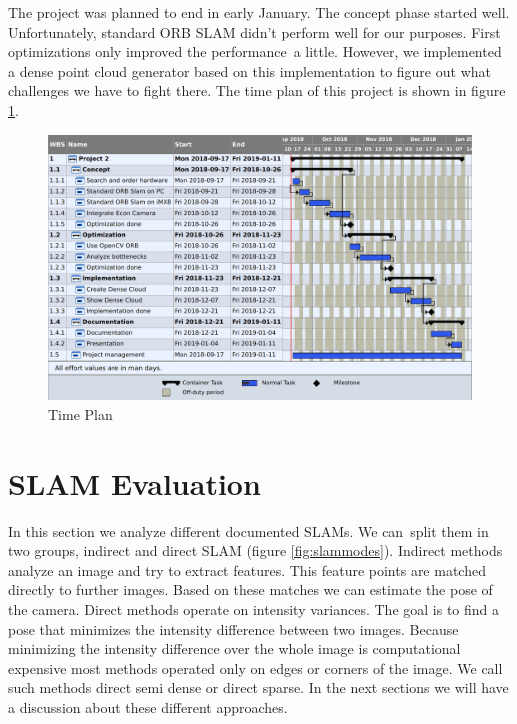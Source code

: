 \documentclass[11pt,a4paper,titlepage,oneside]{report}
\begin{document}
The project was planned to end in early January. The concept phase started well. Unfortunately, standard ORB SLAM didn’t perform well for our purposes. First optimizations only improved the performance a little. However, we implemented a dense point cloud generator based on this implementation to figure out what challenges we have to fight there. The time plan of this project is shown in figure \ref{fig:timeplan}.
\begin{figure}[H]
	\includegraphics[width=1.0\textwidth]{img/timeplan.png}
	\caption{Time Plan}\label{fig:timeplan}
\end{figure}

\chapter{SLAM Evaluation}

In this section we analyze different documented SLAMs. We can split them in two groups, indirect and direct SLAM (figure \ref{fig:slammodes}). Indirect methods analyze an image and try to extract features. This feature points are matched directly to further images. Based on these matches we can estimate the pose of the camera. Direct methods operate on intensity variances. The goal is to find a pose that minimizes the intensity difference between two images. Because minimizing the intensity difference over the whole image is computational expensive most methods operated only on edges or corners of the image. We call such methods direct semi dense or direct sparse. In the next sections we will have a discussion about these different approaches.
\end{document}
